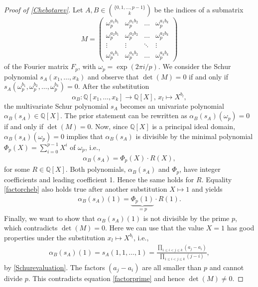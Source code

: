 \documentclass[a4paper]{article}
\renewcommand{\o}{\omega}
\newcommand{\Q}{\ensuremath{\mathbb{Q}}}
\numberwithin{equation}{section}
\numberwithin{table}{section}
\numberwithin{figure}{section}
\begin{document}
\begin{proof}[Proof of \cref{Chebotarev}]
    Let $A,B \in \binom{\{0,1,\ldots,p-1\}}{k}$ be the indices of a submatrix
    \[
    M=
    \begin{pmatrix}
        \omega_p^{a_1b_1}&\o_p^{a_1b_2}& \ldots & \o_p^{a_1b_k}\\
        \o_p^{a_2b_1}&\o_p^{a_2b_2}& \ldots & \o_p^{a_2b_k}\\
        \vdots & \vdots & \ddots & \vdots\\
        \o_p^{a_kb_1}&\o_p^{a_kb_2}&\ldots&\o_p^{a_kb_k}
    \end{pmatrix}
    \]
    of the Fourier matrix $F_p$, with $\o_p=\exp(2 \pi i /p)$. We consider the Schur polynomial $s_A(x_1,\ldots,x_k)$ and observe that $\det(M)=0$ if and only if $s_A(\o_p^{b_1},\o_p^{b_2},\ldots,\o_p^{b_k})=0$. After the substitution 
    \[\alpha_B \colon \Q[x_1,\ldots,x_k] \to \Q[X] \text{, }x_l \mapsto X^{b_l},\]
    the multivariate Schur polynomial $s_A$ becomes an univariate polynomial $\alpha_B(s_A) \in \Q[X]$. The prior statement can be rewritten as $\alpha_B(s_A)(\o_p)=0$ if and only if $\det(M)=0$.
    Now, since $\Q[X]$ is a principal ideal domain, $\alpha_B(s_A)(\o_p)=0$ implies that $\alpha_B(s_A)$ is divisible by the minimal polynomial $\Phi_p(X)=\sum_{i=0}^{p-1}X^i$ of $\o_p$, i.e.,
    \begin{align}\label{factorcheb}
    \alpha_B(s_A)=\Phi_p(X) \cdot R(X),
    \end{align}
    for some $R \in \Q[X]$. Both polynomials, $\alpha_B(s_A)$ and $\Phi_p$, have integer coefficients and leading coefficient 1. Hence the same holds for $R$. Equality \cref{factorcheb} also holds true after another substitution $X \mapsto 1$ and yields
    \begin{align}\label{factorprime}
        \alpha_B(s_A)(1)=\underbrace{\Phi_p(1)}_{=p} \cdot R(1).
    \end{align}
Finally, we want to show that $\alpha_B(s_A)(1)$ is not divisible by the prime $p$, which contradicts $\det(M)=0$. Here we can use that the value $X=1$ has good properties under the substitution $x_l \mapsto X^{b_l}$, i.e.,
    \begin{align*}
    \alpha_B(s_A)(1)%
    =s_A(1,1,\ldots,1)=\frac{\prod\limits_{1\leq i < j \leq k}(a_j-a_i)}{\prod\limits_{1\leq i < j \leq k}(j-i)},
    \end{align*}
    by \cref{Schurevaluation}. The factors $(a_j-a_i)$ are all smaller than $p$ and cannot divide $p$. This contradicts equation \cref{factorprime} and hence $\det(M) \ne 0$.
\end{proof}
\end{document}
